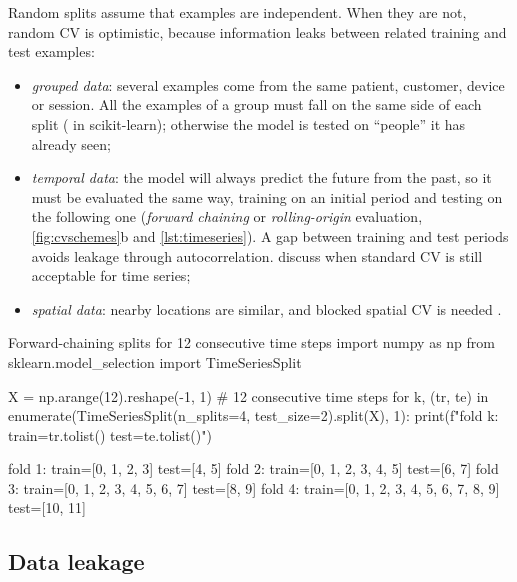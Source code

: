 Random splits assume that examples are independent. When they are not, random CV is
optimistic, because information leaks between related training and test examples:
\begin{itemize}
  \item \emph{grouped data}: several examples come from the same patient, customer, device
        or session. All the examples of a group must fall on the same side of each split
        ( in scikit-learn); otherwise the model is tested on ``people'' it
        has already seen;
  \item \emph{temporal data}: the model will always predict the future from the past, so it
        must be evaluated the same way, training on an initial period and testing on the
        following one (\emph{forward chaining} or \emph{rolling-origin} evaluation,
        \cref{fig:cvschemes}b and \cref{lst:timeseries}). A gap between training and test
        periods avoids leakage through autocorrelation. \citet{bergmeir2012use} discuss when
        standard CV is still acceptable for time series;
  \item \emph{spatial data}: nearby locations are similar, and blocked spatial CV is
        needed \citep{roberts2017cross}.
\end{itemize}

\begin{pylisting}[label={lst:timeseries}]{Forward-chaining splits for 12 consecutive time steps}
import numpy as np
from sklearn.model_selection import TimeSeriesSplit

X = np.arange(12).reshape(-1, 1)          # 12 consecutive time steps
for k, (tr, te) in enumerate(TimeSeriesSplit(n_splits=4, test_size=2).split(X), 1):
    print(f"fold {k}: train={tr.tolist()}  test={te.tolist()}")
\end{pylisting}
\begin{pyoutput}
fold 1: train=[0, 1, 2, 3]  test=[4, 5]
fold 2: train=[0, 1, 2, 3, 4, 5]  test=[6, 7]
fold 3: train=[0, 1, 2, 3, 4, 5, 6, 7]  test=[8, 9]
fold 4: train=[0, 1, 2, 3, 4, 5, 6, 7, 8, 9]  test=[10, 11]
\end{pyoutput}

\subsection{Data leakage}

